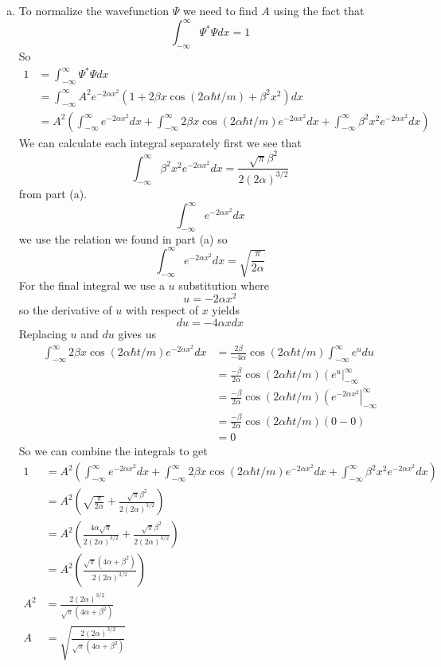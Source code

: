 \documentclass[11pt]{article}
\numberwithin{equation}{section}
\begin{document}
\begin{enumerate}[(a)]
\item
To normalize the wavefunction $\Psi$ we need to find $A$ using the fact that
$$\int^{\infty}_{-\infty}\Psi^*\Psi dx = 1$$
So
\begin{align*}
1 &= \int^{\infty}_{-\infty}\Psi^*\Psi dx\\
&=\int^{\infty}_{-\infty}A^2e^{-2\alpha x^2}\left(1+2\beta x\cos(2\alpha\hbar t/m)+\beta^2 x^2\right)dx\\
&= A^2\left(\int^{\infty}_{-\infty}e^{-2\alpha x^2}dx + \int^{\infty}_{-\infty}2\beta x\cos(2\alpha\hbar t/m)e^{-2\alpha x^2}dx + \int^{\infty}_{-\infty}\beta^2 x^2e^{-2\alpha x^2}dx\right)
\end{align*}
We can calculate each integral separately first we see that  
$$\int^{\infty}_{-\infty}\beta^2 x^2e^{-2\alpha x^2}dx = \frac{\sqrt{\pi}\beta^2}{2(2\alpha)^{3/2}}$$
from part (a).
$$\int^{\infty}_{-\infty}e^{-2\alpha x^2}dx$$ 
we use the relation we found in part (a) so
$$\int^{\infty}_{-\infty}e^{-2\alpha x^2}dx = \sqrt{\frac{\pi}{2\alpha}}$$ 
For the final integral we use a $u$ substitution where
$$u = -2\alpha x^2$$
so the derivative of $u$ with respect of $x$ yields
$$du = -4\alpha xdx$$
Replacing $u$ and $du$ gives us
\begin{align*}
\int^{\infty}_{-\infty}2\beta x\cos(2\alpha\hbar t/m)e^{-2\alpha x^2}dx &= \frac{2\beta}{-4\alpha}\cos(2\alpha\hbar t/m)\int^{\infty}_{-\infty}e^{u}du\\
&= \frac{-\beta}{2\alpha}\cos(2\alpha\hbar t/m)\left(e^u\right|^{\infty}_{-\infty}\\
&= \frac{-\beta}{2\alpha}\cos(2\alpha\hbar t/m)\left(e^{-2\alpha x^2}\right|^{\infty}_{-\infty}\\
&= \frac{-\beta}{2\alpha}\cos(2\alpha\hbar t/m)\left(0-0\right)\\
&= 0
\end{align*}
So we can combine the integrals to get
\begin{align*}
1 &= A^2\left(\int^{\infty}_{-\infty}e^{-2\alpha x^2}dx + \int^{\infty}_{-\infty}2\beta x\cos(2\alpha\hbar t/m)e^{-2\alpha x^2}dx + \int^{\infty}_{-\infty}\beta^2 x^2e^{-2\alpha x^2}dx\right)\\
&= A^2\left(\sqrt{\frac{\pi}{2\alpha}}+\frac{\sqrt{\pi}\beta^2}{2(2\alpha)^{3/2}}\right)\\
&= A^2\left(\frac{4\alpha\sqrt{\pi}}{2(2\alpha)^{3/2}}+\frac{\sqrt{\pi}\beta^2}{2(2\alpha)^{3/2}}\right)\\
&= A^2\left(\frac{\sqrt{\pi}(4\alpha+\beta^2)}{2(2\alpha)^{3/2}}\right)\\
A^2 &= \frac{2(2\alpha)^{3/2}}{\sqrt{\pi}(4\alpha+\beta^2)}\\
A &= \sqrt{\frac{2(2\alpha)^{3/2}}{\sqrt{\pi}(4\alpha+\beta^2)}}
\end{align*}


\end{enumerate}
\end{document}
